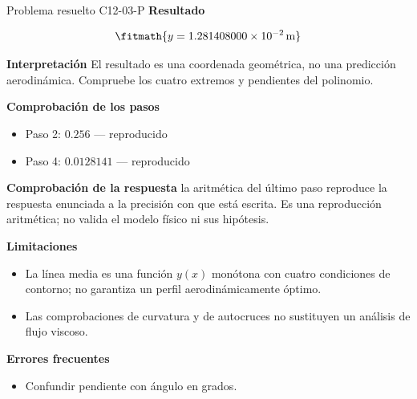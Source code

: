 \documentclass[10pt,openany]{book}
\begin{document}
\begin{studiumworked}{Problema resuelto C12-03-P}
\noindent\textbf{Resultado}

\[
\fitmath{y=1.281408000\times10^{-2}\,\mathrm{m}}
\]

\noindent\textbf{Interpretación}
El resultado es una coordenada geométrica, no una predicción aerodinámica. Compruebe los cuatro extremos y pendientes del polinomio.

\noindent\textbf{Comprobación de los pasos}
\begin{itemize}
\item Paso 2: $0.256$ — reproducido
\item Paso 4: $0.0128141$ — reproducido
\end{itemize}

\noindent\textbf{Comprobación de la respuesta} la aritmética del último paso reproduce la respuesta enunciada a la precisión con que está escrita. Es una reproducción aritmética; no valida el modelo físico ni sus hipótesis.

\noindent\textbf{Limitaciones}
\begin{itemize}
\item La línea media es una función $y(x)$ monótona con cuatro condiciones de contorno; no garantiza un perfil aerodinámicamente óptimo.
\item Las comprobaciones de curvatura y de autocruces no sustituyen un análisis de flujo viscoso.
\end{itemize}

\noindent\textbf{Errores frecuentes}
\begin{itemize}
\item Confundir pendiente con ángulo en grados.
\end{itemize}
\end{studiumworked}
\end{document}
